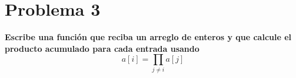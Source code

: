 \section*{Problema 3}
\textbf{Escribe una función que reciba un arreglo de enteros y que calcule el producto acumulado para cada entrada usando}
\begin{equation*}
    a[i] = \prod_{j\neq i} a[j]
\end{equation*}